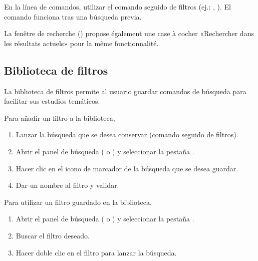 \documentclass[letterpaper,10pt,spanish]{sphinxmanual}
\begin{document}
\sphinxAtStartPar
En la línea de comandos, utilizar el comando  seguido de filtros (ej.: , ). El comando  funciona tras una búsqueda previa.

\sphinxAtStartPar
La fenêtre de recherche () propose également une case à cocher
«Rechercher dans les résultats actuels» pour la même fonctionnalité.


\subsection{Biblioteca de filtros}
\label{\detokenize{annexe_filtres:bibliotheque-de-filtres}}
\sphinxAtStartPar
La biblioteca de filtros permite al usuario guardar comandos de búsqueda para facilitar sus estudios temáticos.

\sphinxAtStartPar
Para añadir un filtro a la biblioteca,
\begin{enumerate}
%
\item {} 
\sphinxAtStartPar
Lanzar la búsqueda que se desea conservar (comando  seguido de filtros).

\item {} 
\sphinxAtStartPar
Abrir el panel de búsqueda ( o ) y seleccionar la pestaña .

\item {} 
\sphinxAtStartPar
Hacer clic en el icono de marcador de la búsqueda que se desea guardar.

\item {} 
\sphinxAtStartPar
Dar un nombre al filtro y validar.

\end{enumerate}

\sphinxAtStartPar
Para utilizar un filtro guardado en la biblioteca,
\begin{enumerate}
%
\item {} 
\sphinxAtStartPar
Abrir el panel de búsqueda ( o ) y seleccionar la pestaña .

\item {} 
\sphinxAtStartPar
Buscar el filtro deseado.

\item {} 
\sphinxAtStartPar
Hacer doble clic en el filtro para lanzar la búsqueda.

\end{enumerate}
\end{document}

